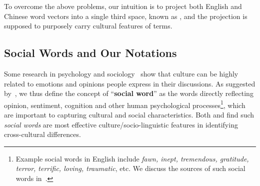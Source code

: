 
To overcome the above problems, our intuition is 
to project both English and Chinese word vectors into a single third space, 
known as \textit{\socvec}, and the projection is supposed to purposely carry 
cultural features of terms.
%


\subsection{Social Words and Our Notations}
Some research in psychology and sociology~\cite{kitayama2000culture, Gareis_2011} show that culture can be highly related to emotions and opinions people express in their discussions.
As suggested by~\citet{Tausczik_2009}, we thus define the concept of ``\textbf{social word}'' as the words directly reflecting opinion, sentiment, cognition and other human psychological processes\footnote{Example social words in 
	English include \textit{fawn, inept, tremendous, gratitude, terror, terrific, loving, traumatic}, etc. We discuss the sources of such social words in~.}, which are important to capturing cultural and social characteristics.
Both \citet{elahi2012examination} and \citet{Garimella2016IdentifyingCD} find such \textit{social words} are 
most effective culture/socio-linguistic features in identifying cross-cultural 
differences. 
%


